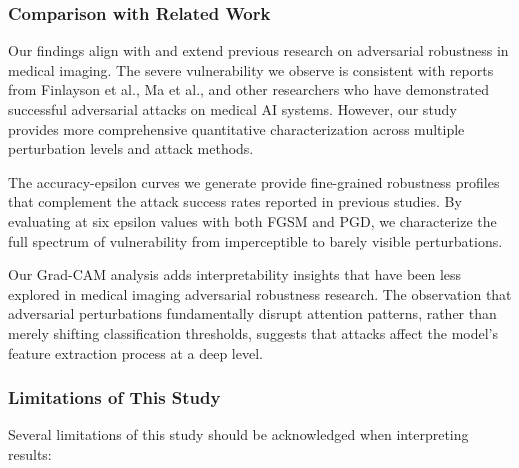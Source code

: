 \documentclass[12pt,a4paper]{article}
\begin{document}
\subsubsection{Comparison with Related Work}

Our findings align with and extend previous research on adversarial robustness in medical imaging. The severe vulnerability we observe is consistent with reports from Finlayson et al., Ma et al., and other researchers who have demonstrated successful adversarial attacks on medical AI systems. However, our study provides more comprehensive quantitative characterization across multiple perturbation levels and attack methods.

The accuracy-epsilon curves we generate provide fine-grained robustness profiles that complement the attack success rates reported in previous studies. By evaluating at six epsilon values with both FGSM and PGD, we characterize the full spectrum of vulnerability from imperceptible to barely visible perturbations.

Our Grad-CAM analysis adds interpretability insights that have been less explored in medical imaging adversarial robustness research. The observation that adversarial perturbations fundamentally disrupt attention patterns, rather than merely shifting classification thresholds, suggests that attacks affect the model's feature extraction process at a deep level.

\subsubsection{Limitations of This Study}

Several limitations of this study should be acknowledged when interpreting results:
\end{document}
